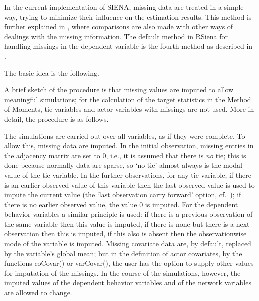\documentclass[a4paper,fleqn,11pt]{article}
\newcommand{\+}{\, + \,}
\newcommand{\sfn}[1]{\textsf{#1}}
\newcommand{\RS}{{\sf RSiena }}
\newcommand{\si}{{\sf SIENA}}
\begin{document}
In the current implementation of \si, missing data are treated in
a simple way, trying to minimize their influence on the estimation
results.
This method is further explained in \citet{HuismanSteglich08},
where comparisons are also made with other ways of dealings with the missing
information. The default method in \RS for handling missings in the dependent
variable is the fourth method as described in \citet{HuismanSteglich08}.

The basic idea is the following.
\medskip

A brief sketch of the procedure is that
missing values are imputed to allow meaningful simulations;
for the calculation of the target statistics in the Method of Moments,
tie variables and actor variables with missings are not
used.
More in detail, the procedure is as follows.

The simulations are carried out over all variables,
as if they were complete.
To allow this, missing data are imputed.
In the initial observation, missing entries in the adjacency
matrix are set to 0,
i.e., it is assumed that there is \emph{no} tie;
this is done because normally data are sparse, so `no tie'
almost always is the modal value of the tie variable.
In the further observations, for any tie variable,
if there is an earlier observed value of this variable then
the last observed value is used to impute the current
value (the `last observation carry forward' option,
cf.\ \citet{Lepkowski89}); if there is no earlier observed
value, the value 0 is imputed.
For the dependent behavior variables a similar principle
is used: if there is a previous observation of the same variable
then this value is imputed, if there is none but there
is a next observation then this is imputed, if this also is absent
then the observationwise mode of the variable is imputed.
Missing covariate data are, by default, replaced by the
variable's global mean; but in the definition of actor covariates,
by the functions \sfn{coCovar()} or \sfn{varCovar()}, the user
has the option to supply other values for imputation of the missings.
In the course of the simulations, however, the imputed values of the dependent
behavior variables and of the network variables are allowed to change.
\medskip
\end{document}
